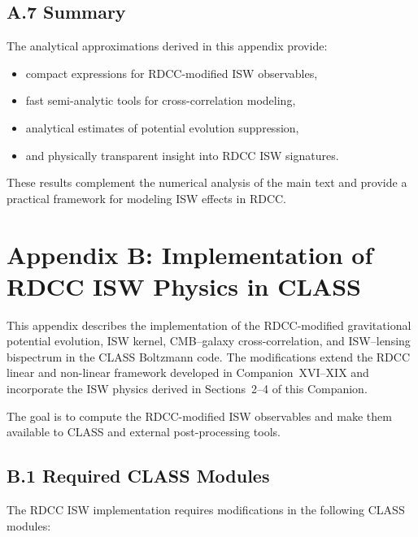\documentclass[11pt,a4paper]{article}
\begin{document}
\subsection*{A.7 Summary}

The analytical approximations derived in this appendix provide:

\begin{itemize}
    \item compact expressions for RDCC-modified ISW observables,
    \item fast semi-analytic tools for cross-correlation modeling,
    \item analytical estimates of potential evolution suppression,
    \item and physically transparent insight into RDCC ISW signatures.
\end{itemize}

These results complement the numerical analysis of the main text and provide a practical 
framework for modeling ISW effects in RDCC.

\section*{Appendix B: Implementation of RDCC ISW Physics in CLASS}

This appendix describes the implementation of the RDCC-modified gravitational potential 
evolution, ISW kernel, CMB–galaxy cross-correlation, and ISW–lensing bispectrum in the 
CLASS Boltzmann code. The modifications extend the RDCC linear and non-linear framework 
developed in Companion~XVI–XIX and incorporate the ISW physics derived in Sections~2–4 of 
this Companion.

The goal is to compute the RDCC-modified ISW observables and make them available to CLASS 
and external post-processing tools.

\subsection*{B.1 Required CLASS Modules}

The RDCC ISW implementation requires modifications in the following CLASS modules:
\end{document}
